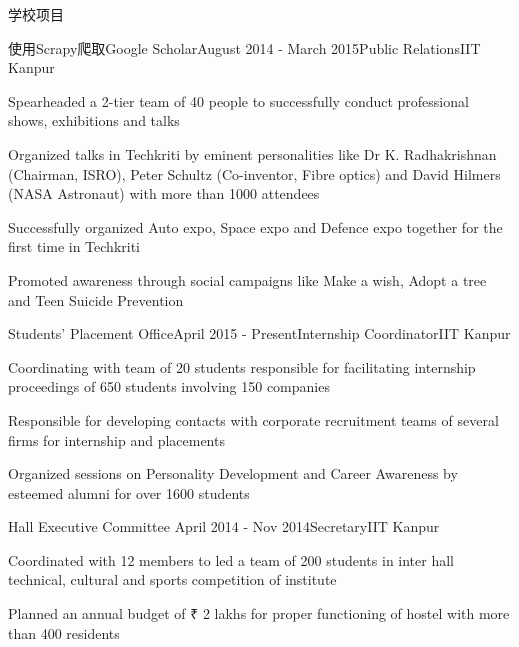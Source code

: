 \documentclass{resume} %
\begin{document}
\begin{rSection}{学校项目}

\begin{rSubsection}{使用Scrapy爬取Google Scholar}{August 2014 - March 2015}{Public Relations}{IIT Kanpur}
\item Spearheaded a 2-tier team of 40 people to successfully conduct professional shows, exhibitions and talks
\item Organized talks in Techkriti by eminent personalities like Dr K. Radhakrishnan (Chairman, ISRO), Peter Schultz (Co-inventor, Fibre optics) and David Hilmers (NASA Astronaut) with more than 1000 attendees
\item Successfully organized Auto expo, Space expo and Defence expo together for the first time in Techkriti
\item Promoted awareness through social campaigns like Make a wish, Adopt a tree and Teen Suicide Prevention
\end{rSubsection}


\begin{rSubsection}{Students' Placement Office}{April 2015 - Present}{Internship Coordinator}{IIT Kanpur}
\item Coordinating with team of 20 students responsible for facilitating internship proceedings of 650 students involving 150 companies
 \item Responsible for developing contacts with corporate recruitment teams of several firms for internship and placements 
 \item Organized sessions on Personality Development and Career Awareness by esteemed alumni for over 1600 students
\end{rSubsection}


\begin{rSubsection}{Hall Executive Committee }{April 2014 - Nov 2014}{Secretary}{IIT Kanpur}
\item Coordinated with 12 members to led a team of 200 students in inter hall technical, cultural and sports competition of institute 
\item Planned an annual budget of ₹ 2 lakhs for proper functioning of hostel with more than 400 residents
\end{rSubsection}

\end{rSection}
\end{document}
